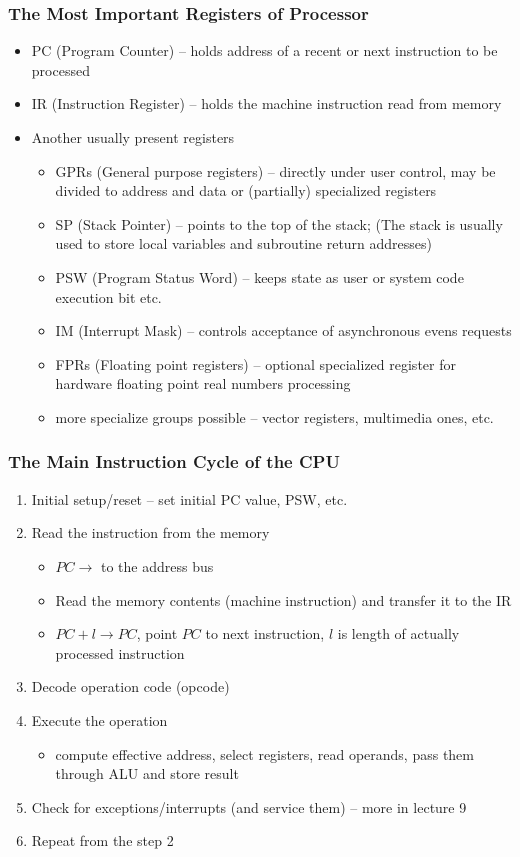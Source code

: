 \documentclass{beamer}
\begin{document}
\begin{frame}
\frametitle{The Most Important Registers of Processor}
\begin{itemize}
\item PC (Program Counter) -- holds address of a recent or next instruction to be processed
\item IR (Instruction Register) -- holds the machine instruction read from memory
\item Another usually present registers
\begin{itemize}
\item GPRs (General purpose registers) -- directly under user control, may be divided to address and data or (partially) specialized registers
\item SP (Stack Pointer) -- points to the top of the stack; (The stack is usually used to store local variables and subroutine return addresses)
\item PSW (Program Status Word) -- keeps state as user or system code execution bit etc.
\item IM (Interrupt Mask) -- controls acceptance of asynchronous evens requests
\item FPRs (Floating point registers) -- optional specialized register for hardware floating point real numbers processing
\item more specialize groups possible -- vector registers, multimedia ones, etc.
\end{itemize}
\end{itemize}
\end{frame}

\begin{frame}
\frametitle{The Main Instruction Cycle of the CPU}
\begin{enumerate}
  \item Initial setup/reset -- set initial PC value, PSW, etc.
  \item Read the instruction from the memory
  \begin{itemize}
    \item $PC \to$ to the address bus
    \item Read the memory contents (machine instruction) and transfer it to the IR
    \item $PC+l \to PC$, point $PC$ to next instruction, $l$ is length of actually processed instruction
  \end{itemize}
  \item Decode operation code (opcode)
  \item Execute the operation
  \begin{itemize}
    \item compute effective address, select registers, read operands, pass them through ALU and store result
  \end{itemize}
  \item Check for exceptions/interrupts (and service them) -- more in lecture 9
  \item Repeat from the step 2
\end{enumerate}
\end{frame}
\end{document}

